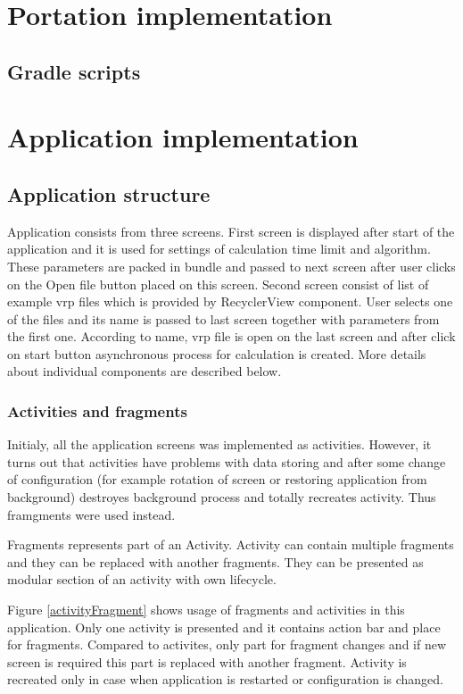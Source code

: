 \section{Portation implementation}
\subsection{Gradle scripts}


\section{Application implementation}

\subsection{Application structure} %
Application consists from three screens. First screen is displayed after start of the application and it is used for
settings of calculation time limit and algorithm. These parameters are packed in bundle and passed to next screen after
user clicks on the Open file button placed on this screen. Second screen consist of list of example vrp files which is
provided by RecyclerView component. User selects one of the files and its name is passed to last screen together with
parameters from the first one. According to name, vrp file is open on the last screen and after click on start button
asynchronous process for calculation is created. More details about individual components are described below.

\subsubsection{Activities and fragments}
Initialy, all the application screens was implemented as activities. However, it turns out that activities have problems
with data storing and after some change of configuration (for example rotation of screen or restoring application from
background) destroyes background process and totally recreates activity. Thus framgments were used instead.

Fragments represents part of an Activity. Activity can contain multiple fragments and they can be replaced with another
fragments. They can be presented as modular section of an activity with own lifecycle.

Figure \ref{activityFragment} shows usage of fragments and activities in this application. Only one activity is presented and it
contains action bar and place for fragments. Compared to activites, only part for fragment changes and if new screen is
required this part is replaced with another fragment. Activity is recreated only in case when application is restarted
or configuration is changed.

